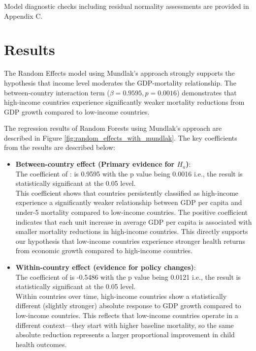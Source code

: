 \documentclass[10pt,a4paper]{article}
\begin{document}
Model diagnostic checks including residual normality assessments are provided in Appendix C.

\section{Results}

The Random Effects model using Mundlak's approach strongly supports the hypothesis that income level moderates the GDP-mortality relationship. The between-country interaction term ($\beta = 0.9595, p = 0.0016$) demonstrates that high-income countries experience significantly weaker mortality reductions from GDP growth compared to low-income countries.

The regression results of Random Forests using Mundlak's approach are described in Figure \ref{fig:random_effects_with_mundlak}. The key coefficients from the results are described below:

\begin{itemize}
    \item \textbf{Between-country effect (Primary evidence for $H_{a}$)}:
    \\
    The coefficient of : is 0.9595 with the p value being 0.0016 i.e., the result is statistically significant at the 0.05 level.
    \\
    This coefficient shows that countries persistently classified as high-income experience a significantly weaker relationship between GDP per capita and under-5 mortality compared to low-income countries. The positive coefficient indicates that each unit increase in average GDP per capita is associated with smaller mortality reductions in high-income countries. This directly supports our hypothesis that low-income countries experience stronger health returns from economic growth compared to high-income countries.
    
    \item \textbf{Within-country effect (evidence for policy changes)}:
    \\ The coefficient of  is -0.5486 with the p value being 0.0121 i.e., the result is statistically significant at the 0.05 level.
    \\
    Within countries over time, high-income countries show a statistically different (slightly stronger) absolute response to GDP growth compared to low-income countries. This reflects that low-income countries operate in a different context—they start with higher baseline mortality, so the same absolute reduction represents a larger proportional improvement in child health outcomes.
    \end{itemize}
    
\end{document}
